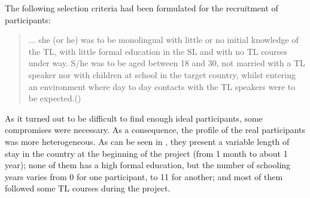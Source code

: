 \documentclass[output=paper]{langscibook}
\begin{document}
The following selection criteria had been formulated for the recruitment of participants: 

\begin{quote}
... she (or he) was to be monolingual with little or no initial knowledge of the TL, with little formal education in the SL and with no TL courses under way. S/he was to be aged between 18 and 30, not married with a TL speaker nor with children at school in the target country, whilst entering an environment where day to day contacts with the TL speakers were to be expected.\hbox{}\hfill\hbox{(\citealt[42]{Perdue1993vol1})}
\end{quote}

As it turned out to be difficult to find enough ideal participants, some compromises were necessary. As a consequence, the profile of the real participants was more heterogeneous. As can be seen in , they present a variable length of stay in the country at the beginning of the project (from 1 month to about 1 year); none of them has a high formal education, but the number of schooling years varies from 0 for one participant, to 11 for another; and most of them followed some TL courses during the project. 
\end{document}
